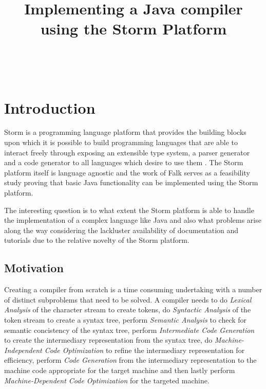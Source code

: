 \documentclass{sigchi}
\def\plaintitle{Implementing a Java compiler using the Storm Platform}
\begin{document}
\title{\plaintitle}

\author{%
  \\
  \\
}

\maketitle
\section{Introduction}
Storm is a programming language platform that provides the building blocks upon which it is possible to build programming languages that are able to interact freely through exposing an extensible type system, a parser generator and a code generator to all languages which desire to use them \cite{stromback:2018}. The Storm platform itself is language agnostic and the work of Falk\cite{} serves as a feasibility study proving that basic Java functionality can be implemented using the Storm platform.

The interesting question is to what extent the Storm platform is able to handle the implementation of a complex language like Java and also what problems arise along the way considering the lackluster availability of documentation and tutorials due to the relative novelty of the Storm platform.

\subsection{Motivation}
Creating a compiler from scratch is a time consuming undertaking with a number of distinct subproblems that need to be solved. A compiler needs to do \emph{Lexical Analysis} of the character stream to create tokens, do \emph{Syntactic Analysis} of the token stream to create a syntax tree, perform \emph{Semantic Analysis} to check for semantic concistency of the syntax tree, perform \emph{Intermediate Code Generation} to create the intermediary representation from the syntax tree, do \emph{Machine-Independent Code Optimization} to refine the intermediary representation for efficiency, perform \emph{Code Generation} from the intermediary representation to the machine code appropriate for the target machine and then lastly perform \emph{Machine-Dependent Code Optimization} for the targeted machine\cite{dragon}.
\end{document}
